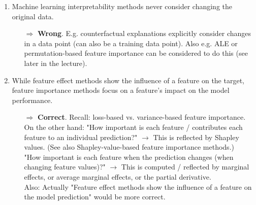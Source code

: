 \begin{enumerate}
    	\item Machine learning interpretability methods never consider changing the original data.
    	\begin{itemize}
    		\item[$\Rightarrow$] \textbf{Wrong}.
            E.g. counterfactual explanations explicitly consider changes in a data point (can also be a training data point). Also e.g. ALE or permutation-based feature importance can be considered to do this (see later in the lecture).
    	\end{itemize}

    	\item While feature effect methods show the influence of a feature on the target, feature importance methods focus on a feature's impact on the model performance.
    	\begin{itemize}
    		\item[$\Rightarrow$] \textbf{Correct}. Recall: loss-based vs. variance-based feature importance. \\
            On the other hand: "How important is each feature / contributes each feature to an individual prediction?" \(\rightarrow\) This is reflected by Shapley values. (See also Shapley-value-based feature importance methods.) \\
            "How important is each feature when the prediction changes (when changing feature values)?" \(\rightarrow\) This is computed / reflected by marginal effects, or average marginal effects, or the partial derivative. \\
            Also: Actually "Feature effect methods show the influence of a feature on the model prediction" would be more correct.
    	\end{itemize}
        
    \end{enumerate}

